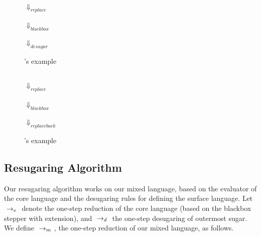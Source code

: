 \begin{center}
\begin{figure}[thb]
\centering
{}\\ $\Downarrow_{replace}$\\ \\ $\Downarrow_{blackbox}$\\ \\ $\Downarrow_{desugar}$\\ 
\caption{'s example}
\label{fig:e1}
\end{figure}

\begin{figure}[thb]
\centering
{}\\ $\Downarrow_{replace}$ \\\\ $\Downarrow_{blackbox}$\\  \\ $\Downarrow_{replaceback}$\\ 
\caption{'s example}
\label{fig:e2}
\end{figure}



\end{center}

\subsection{Resugaring Algorithm}

Our resugaring algorithm works on our mixed language, based on the evaluator of the core language and the desugaring rules for defining the surface language. Let $~\rightarrow_e~$ denote the one-step reduction of the core language (based on the blackbox stepper with extension), and $~\rightarrow_d~$ the one-step desugaring of outermost sugar. We define $~\rightarrow_m~$, the one-step reduction of our mixed language, as follows.

\label{mark:miexedreduction}
{}

